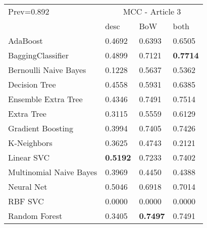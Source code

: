 \begin{tabular}{|l|l|l|l| }
\hline
Prev=0.892 &  \multicolumn{3}{c|}{MCC - Article 3} \\
\cline{2-4} & desc & BoW & both \\ \hline
AdaBoost                & 0.4692 & 0.6393 & 0.6505\\
BaggingClassifier       & 0.4899 & 0.7121 & {\bf 0.7714}\\
Bernoulli Naive Bayes   & 0.1228 & 0.5637 & 0.5362\\
Decision Tree           & 0.4558 & 0.5931 & 0.6385\\
Ensemble Extra Tree     & 0.4346 & 0.7491 & 0.7514\\
Extra Tree              & 0.3115 & 0.5559 & 0.6129\\
Gradient Boosting       & 0.3994 & 0.7405 & 0.7426\\
K-Neighbors             & 0.3625 & 0.4743 & 0.2121\\
Linear SVC              & {\bf 0.5192} & 0.7233 & 0.7402\\
Multinomial Naive Bayes & 0.3969 & 0.4450 & 0.4388\\
Neural Net              & 0.5046 & 0.6918 & 0.7014\\
RBF SVC                 & 0.0000 & 0.0000 & 0.0000\\
Random Forest           & 0.3405 & {\bf 0.7497} & 0.7491\\
\hline
\end{tabular}